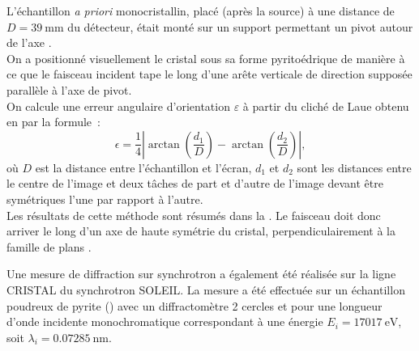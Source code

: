L'échantillon \textit{a priori} monocristallin, placé (après la source) à une distance de \(D = \SI{39}{\milli\metre}\) du détecteur, était monté sur un support permettant un pivot autour de l'axe \hmn{[hkl]}.\\
On a positionné visuellement le cristal sous sa forme pyritoédrique de manière à ce que le faisceau incident tape le long d'une arête verticale de direction supposée parallèle à l'axe de pivot. \\
On calcule une erreur angulaire d'orientation \(\varepsilon\) à partir du cliché de Laue obtenu en  par la formule~:
\begin{equation}
\epsilon = \frac{1}{4} \left| \arctan\left( \frac{d_1}{D} \right) - \arctan\left(\frac{d_2}{D}\right) \right|,
\end{equation}
où \(D\) est la distance entre l'échantillon et l'écran, \(d_1\) et \(d_2\) sont les distances entre le centre de l'image et deux tâches de part et d'autre de l'image devant être symétriques l'une par rapport à l'autre.\\
Les résultats de cette méthode sont résumés dans la .
Le faisceau doit donc arriver le long d'un axe de haute symétrie du cristal, perpendiculairement à la famille de plans .\\
\begin{table}
\label{tab:LaueAngleError}
\end{table}

Une mesure de diffraction sur synchrotron a également été réalisée sur la ligne CRISTAL du synchrotron SOLEIL. La mesure a été effectuée sur un échantillon poudreux de pyrite () avec un diffractomètre 2 cercles et pour une longueur d'onde incidente monochromatique correspondant à une énergie \(E_i = \SI{17017}{\electronvolt}\), soit \(\lambda_i = \SI{0.07285}{\nano\metre}\).\\

